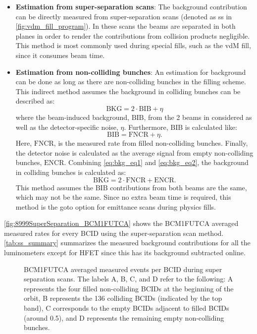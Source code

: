 \begin{itemize}
	\item \textbf{Estimation from super-separation scans}: The background contribution can be directly measured from super-separation scans (denoted as ss in \autoref{fig:vdm_fill_program}). In these scans the beams are separated in both planes in order to render the contributions from collision products negligible. This method is most commonly used during special fills, such as the vdM fill, since it consumes beam time.
	\item \textbf{Estimation from non-colliding bunches}: An estimation for background can be done as long as there are non-colliding bunches in the filling scheme. This indirect method assumes the background in colliding bunches can be described as:
	\begin{equation}
		\label{eq:bkg_eq1}
		\mathrm{BKG} = 2 \cdot \mathrm{BIB} + \eta
	\end{equation}
	where the beam-induced background, $\mathrm{BIB}$, from the 2 beams in considered as well as the detector-specific noise, $\eta$. Furthermore, $\mathrm{BIB}$ is calculated like:
	\begin{equation}
		\label{eq:bkg_eq2}
		\mathrm{BIB} = \mathrm{FNCR} + \eta.
	\end{equation}
	Here, $\mathrm{FNCR}$, is the measured rate from filled non-colliding bunches. Finally, the detector noise is calculated as the average signal from empty non-colliding bunches, $\mathrm{ENCR}$. Combining \autoref{eq:bkg_eq1} and \autoref{eq:bkg_eq2}, the background in colliding bunches is calculated as:
	\begin{equation}
		\mathrm{BKG} = 2 \cdot \mathrm{FNCR} + \mathrm{ENCR}.
	\end{equation}
	This method assumes the $\mathrm{BIB}$ contributions from both beams are the same, which may not be the same. Since no extra beam time is required, this method is the goto option for emittance scans during physics fills.
\end{itemize}

\autoref{fig:8999SuperSeparation_BCM1FUTCA} shows the BCM1FUTCA averaged measured rates for every BCID using the super-separation scan method. \autoref{tab:ss_summary} summarizes the measured background contributions for all the luminometers except for HFET since this has its background subtracted online.

\begin{figure}[!htb]
	\centering
	\caption[BCM1FUTCA hits in super-separation scan]{BCM1FUTCA averaged measured events per BCID during super separation scans. The labels A, B, C, and D refer to the following: A represents the four filled non-colliding BCIDs at the beginning of the orbit, B represents the 136 colliding BCIDs (indicated by the top band), C corresponds to the empty BCIDs adjacent to filled BCIDs (around 0.5), and D represents the remaining empty non-colliding bunches.}
	\label{fig:8999SuperSeparation_BCM1FUTCA}
\end{figure}

